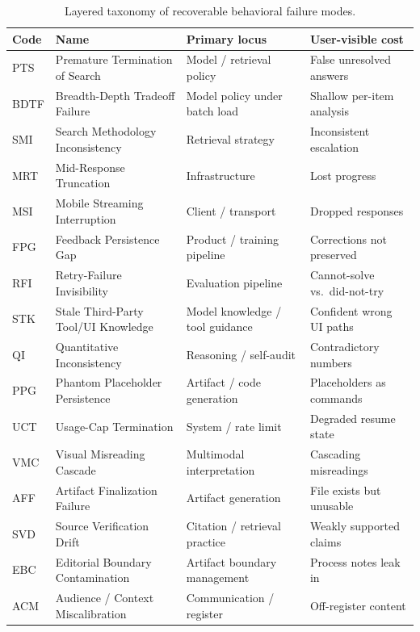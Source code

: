 \documentclass[11pt]{article}
\begin{document}
\begin{table}[h]
\centering\small
\caption{Layered taxonomy of recoverable behavioral failure modes.}
\label{tab:taxonomy}
\begin{tabularx}{\linewidth}{l X X X}
\toprule
\textbf{Code} & \textbf{Name} & \textbf{Primary locus} & \textbf{User-visible cost} \\
\midrule
PTS  & Premature Termination of Search     & Model / retrieval policy           & False unresolved answers \\
BDTF & Breadth-Depth Tradeoff Failure      & Model policy under batch load      & Shallow per-item analysis \\
SMI  & Search Methodology Inconsistency    & Retrieval strategy                 & Inconsistent escalation \\
MRT  & Mid-Response Truncation             & Infrastructure                     & Lost progress \\
MSI  & Mobile Streaming Interruption       & Client / transport                 & Dropped responses \\
FPG  & Feedback Persistence Gap            & Product / training pipeline        & Corrections not preserved \\
RFI  & Retry-Failure Invisibility          & Evaluation pipeline                & Cannot-solve vs.\ did-not-try \\
STK  & Stale Third-Party Tool/UI Knowledge & Model knowledge / tool guidance    & Confident wrong UI paths \\
QI   & Quantitative Inconsistency          & Reasoning / self-audit             & Contradictory numbers \\
PPG  & Phantom Placeholder Persistence     & Artifact / code generation         & Placeholders as commands \\
UCT  & Usage-Cap Termination               & System / rate limit                & Degraded resume state \\
VMC  & Visual Misreading Cascade           & Multimodal interpretation          & Cascading misreadings \\
AFF  & Artifact Finalization Failure       & Artifact generation                & File exists but unusable \\
SVD  & Source Verification Drift           & Citation / retrieval practice      & Weakly supported claims \\
EBC  & Editorial Boundary Contamination    & Artifact boundary management       & Process notes leak in \\
ACM  & Audience / Context Miscalibration   & Communication / register           & Off-register content \\
\bottomrule
\end{tabularx}
\end{table}
\end{document}
